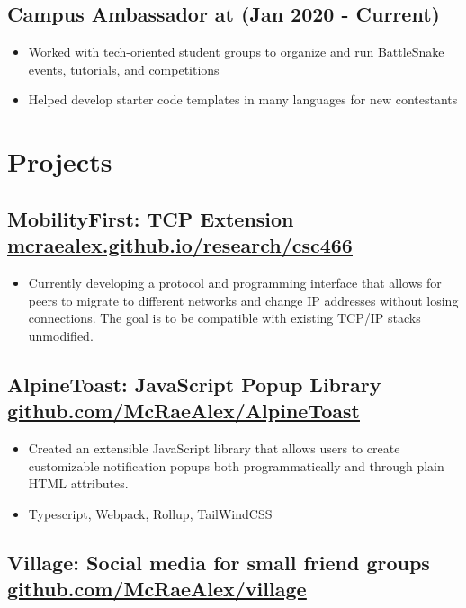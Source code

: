 \documentclass{article}
\newcommand{\hrefColored}[3]{\href{#2}{\color{#1}{#3}}}
\begin{document}
\subsection{Campus Ambassador at \hrefColored{blue}{https://play.battlesnake.com/}{\underline{BattleSnake}} (Jan 2020 - Current)}

\begin{itemize}
    \item Worked with tech-oriented student groups to organize and run BattleSnake events, tutorials, and competitions
    \item Helped develop starter code templates in many languages for new contestants
\end{itemize}

\section{Projects}

\subsection{MobilityFirst: TCP Extension \href{https://mcraealex.github.io/research/csc466}{\underline{mcraealex.github.io/research/csc466}}}

\begin{itemize}
    \item Currently developing a protocol and programming interface that allows for peers to migrate to different networks and change IP addresses without losing connections. The goal is to be compatible with existing TCP/IP stacks unmodified.
\end{itemize}

\subsection{AlpineToast: JavaScript Popup Library \href{https://github.com/McRaeAlex/AlpineToast}{\underline{github.com/McRaeAlex/AlpineToast}}}

\begin{itemize}
    \item Created an extensible JavaScript library that allows users to create customizable notification popups both programmatically and through plain HTML attributes. 
    \item Typescript, Webpack, Rollup, TailWindCSS 
\end{itemize}

\subsection{Village: Social media for small friend groups \href{https://github.com/McRaeAlex/village}{\underline{github.com/McRaeAlex/village}}}
\end{document}
